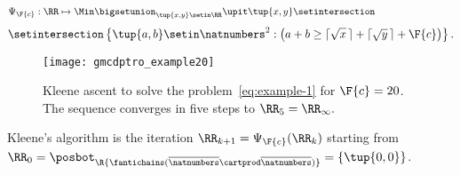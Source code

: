 \begin{equation}
    \Psi_{\F{c}}:\RR\mapsto\Min\bigsetunion_{\tup{ x,y} \setin\RR}\upit\tup{ x,y} \setintersection\qquad\qquad\qquad\qquad
\end{equation}
%
\begin{equation}
    \setintersection\left\{ \tup{ a,b} \setin\natnumbers^{2}:\left(a+b\geq\lceil\sqrt{x}\,\rceil+\lceil\sqrt{y}\,\rceil+\F{c}\right)\right\}.
\end{equation}
%

\begin{figure}
    \begin{centering}
        \texttt{[image: gmcdptro\_example20]}
    \end{centering}
    \caption{Kleene ascent to solve the problem~\cref{eq:example-1} for $\F{c}=20$.
        The sequence converges in five steps to $\RR_{5}=\RR_{\infty}.
        $ }
    \label{fig:example24}
\end{figure}

\noindent Kleene's algorithm is the iteration $\RR_{k+1}=\Psi_{\F{c}}(\RR_{k})$
starting from $\RR_{0}=\posbot_{\R{\fantichains(\overline{\natnumbers}\cartprod\overline{\natnumbers})}}=\{\tup{ 0,0} \}$.


